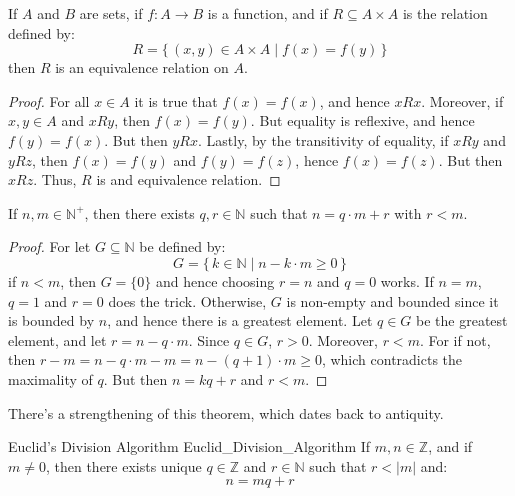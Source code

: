     \begin{theorem}
        \label{thm:Fibers_of_Func_Form_Equiv_Relation}%
        If $A$ and $B$ are sets, if $f:A\rightarrow{B}$ is a function,
        and if $R\subseteq{A}\times{A}$ is the relation defined by:
        \begin{equation}
            R=\{\,(x,y)\in{A}\times{A}\;|\;f(x)=f(y)\,\}
        \end{equation}
        then $R$ is an equivalence relation on $A$.
    \end{theorem}
    \begin{proof}
        For all $x\in{A}$ it is true that $f(x)=f(x)$, and hence $xRx$.
        Moreover, if $x,y\in{A}$ and $xRy$, then $f(x)=f(y)$. But
        equality is reflexive, and hence $f(y)=f(x)$. But then $yRx$.
        Lastly, by the transitivity of equality, if $xRy$ and $yRz$,
        then $f(x)=f(y)$ and $f(y)=f(z)$, hence $f(x)=f(z)$. But then
        $xRz$. Thus, $R$ is and equivalence relation.
    \end{proof}
    \begin{theorem}
        \label{thm:Weak_Euc_Division_Alg}%
        If $n,m\in\mathbb{N}^{+}$, then there exists $q,r\in\mathbb{N}$
        such that $n=q\cdot{m}+r$ with $r<m$.
    \end{theorem}
    \begin{proof}
        For let $G\subseteq\mathbb{N}$ be defined by:
        \begin{equation}
            G=\{\,k\in\mathbb{N}\;|\;n-k\cdot{m}\geq{0}\,\}
        \end{equation}
        if $n<m$, then $G=\{0\}$ and hence choosing $r=n$ and $q=0$
        works. If $n=m$, $q=1$ and $r=0$ does the trick. Otherwise, $G$
        is non-empty and bounded since it is bounded by $n$, and hence
        there is a greatest element. Let $q\in{G}$ be the greatest
        element, and let $r=n-q\cdot{m}$. Since $q\in{G}$, $r>0$.
        Moreover, $r<m$. For if not, then
        $r-m=n-q\cdot{m}-m=n-(q+1)\cdot{m}\geq{0}$, which contradicts
        the maximality of $q$. But then $n=kq+r$ and $r<m$.
    \end{proof}
    There's a strengthening of this theorem, which dates back to
    antiquity.
    \begin{ftheorem}{Euclid's Division Algorithm}
                    {Euclid_Division_Algorithm}
        If $m,n\in\mathbb{Z}$, and if $m\ne{0}$, then there exists
        unique $q\in\mathbb{Z}$ and $r\in\mathbb{N}$ such that $r<|m|$
        and:
        \begin{equation*}
            n=mq+r
        \end{equation*}
    \end{ftheorem}

